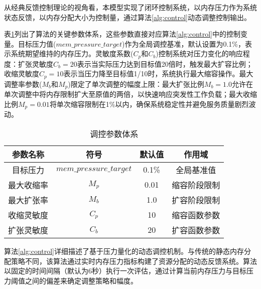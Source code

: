 从经典反馈控制理论的视角看，本模型实现了闭环控制系统，以内存压力作为系统状态反馈，以内存分配大小为控制量，通过算法\ref{alg:control}动态调整控制输出。

表\ref{tab:params}列出了算法的关键参数体系，这些参数直接对应算法\ref{alg:control}中的控制变量。目标压力值(\(mem\_pressure\_target\))作为全局调控基准，默认设置为0.1\%，表示系统期望维持的内存压力。灵敏度系数(\(C_p\)和\(C_b\))控制系统对压力变化的响应程度：扩张灵敏度\(C_b = 20\)表示当实际压力达到目标值20倍时，触发最大扩容比例；收缩灵敏度\(C_p = 10\)表示当压力降至目标值1/10时，系统执行最大缩容操作。最大调整率参数(\(M_b\)和\(M_p\))限定了单次调整的幅度上限：最大扩张比例\(M_b = 1.0\)允许在单次调整中将内存限制扩大至原值的两倍，以快速响应突发性工作负载；最大收缩比例\(M_p = 0.01\)将单次缩容限制在1\%以内，确保系统稳定性并避免服务质量剧烈波动。

\begin{table}[H]
\centering
\caption{调控参数体系}
\label{tab:params}
\begin{tabular}{cccc}
\toprule
参数名称 & 符号 & 默认值 & 作用域 \\
\midrule
目标压力 & \(mem\_pressure\_target\) & 0.1\% & 全局基准值 \\
最大收缩率 & \(M_p\) & 0.01 & 缩容阶段限制 \\
最大扩张率 & \(M_b\) & 1.0 & 扩容阶段限制 \\
收缩灵敏度 & \(C_p\) & 10 & 缩容函数参数 \\
扩张灵敏度 & \(C_b\) & 20 & 扩容函数参数 \\
\bottomrule
\end{tabular}
\end{table}


算法\ref{alg:control}详细描述了基于压力量化的动态调控机制。与传统的静态内存分配策略不同，该算法通过实时内存压力指标构建了资源分配的动态反馈系统。算法以固定的时间间隔（默认为6秒）执行一次评估，通过计算当前内存压力与目标压力阈值之间的偏差来确定调整策略和幅度。

